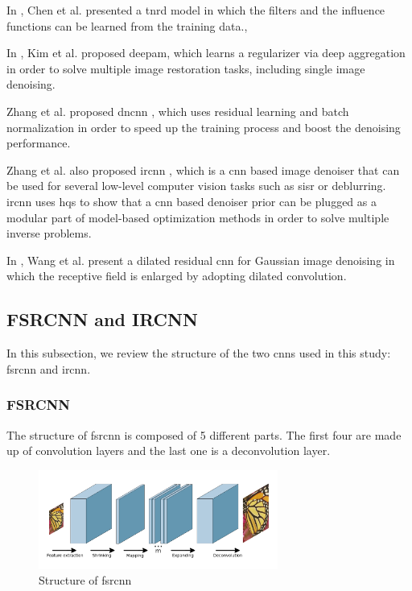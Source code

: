 In \cite{TNRD}, Chen et al. presented a  \gls{tnrd} model in which the filters and the influence functions can be learned from the training data., 

In \cite{DEEPAM}, Kim et al. proposed \gls{deepam}, which learns a regularizer via deep aggregation in order to solve multiple image restoration tasks, including single image denoising.  

Zhang et al. proposed \gls{dncnn} \cite{DNCNN}, which uses residual learning and batch normalization in order to speed up the training process and boost the denoising performance.

Zhang et al. also proposed \gls{ircnn} \cite{IRCNN}, which is a \gls{cnn} based image denoiser that can be used for several low-level computer vision tasks such as \gls{sisr} or deblurring. \gls{ircnn} uses \gls{hqs} to show that a \gls{cnn} based denoiser prior can be plugged as a modular part of model-based optimization methods in order to solve multiple inverse problems.

In \cite{DILATED}, Wang et al. present a dilated residual \gls{cnn} for Gaussian image denoising in which the receptive field is enlarged by adopting dilated convolution.

\subsection{FSRCNN and IRCNN}
In this subsection, we review the structure of the two \glspl{cnn} used in this study: \gls{fsrcnn} and \gls{ircnn}.

\subsubsection{FSRCNN} The structure of \gls{fsrcnn} is composed of 5 different parts. The first four are made up of convolution layers and the last one is a deconvolution layer.

\begin{figure}
	\centering
	\includegraphics[width=0.7\textwidth]{images/fsrcnn.png}
	\caption{Structure of \gls{fsrcnn}}
	\label{fig:fsrcnn}
\end{figure}

